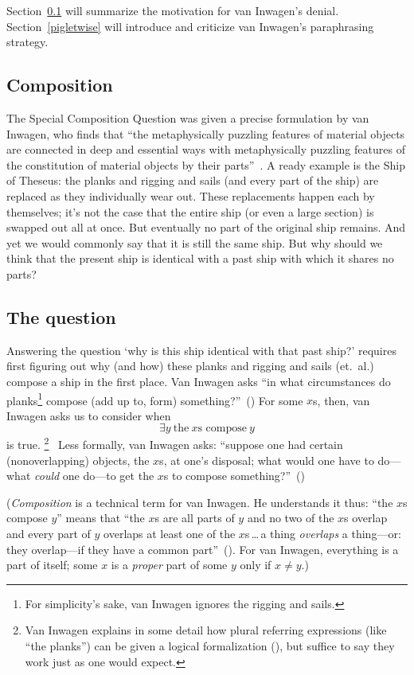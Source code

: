 \documentclass[11pt]{article}
\begin{document}
\begin{spacing}{1.5}
Section~\ref{comp} will summarize the motivation for van Inwagen's denial. Section~\ref{pigletwise} will introduce and criticize van Inwagen's paraphrasing strategy.

\subsection{Composition}
\label{comp}
The Special Composition Question was given a precise formulation by van Inwagen, who finds that ``the metaphysically puzzling features of material objects are connected in deep and essential ways with metaphysically puzzling features of the constitution of material objects by their parts''~\citep[18]{inwagen1995}. A ready example is the Ship of Theseus: the planks and rigging and sails (and every part of the ship) are replaced as they individually wear out. These replacements happen each by themselves; it's not the case that the entire ship (or even a large section) is swapped out all at once. But eventually no part of the original ship remains. And yet we would commonly say that it is still the same ship. But why should we think that the present ship is identical with a past ship with which it shares no parts?

\subsection{The question}
\label{scq}
Answering the question `why is this ship identical with that past ship?' requires first figuring out why (and how) these planks and rigging and sails (et.\ al.) compose a ship in the first place. Van Inwagen asks ``in what circumstances do planks\footnote{For simplicity's sake, van Inwagen ignores the rigging and sails.} compose (add up to, form) something?''~(\citeyear[21]{inwagen1995}) For some $x$s, then, van Inwagen asks us to consider when
\begin{equation}
\exists y\ \text{the}\ x\text{s compose}\ y
\end{equation}
is true.%
\footnote{Van Inwagen explains in some detail how plural referring expressions (like ``the planks'') can be given a logical formalization (\citeyear[23--28]{inwagen1995}), but suffice to say they work just as one would expect.}%
%
\ Less formally, van Inwagen asks: ``suppose one had certain (nonoverlapping) objects, the $x$s, at one's disposal; what would one have to do---what {\em could} one do---to get the $x$s to compose something?''~(\citeyear[31]{inwagen1995})

({\em Composition} is a technical term for van Inwagen. He understands it thus: ``the $x$s compose $y$'' means that ``the $x$s are all parts of $y$ and no two of the $x$s overlap and every part of $y$ overlaps at least one of the $x$s\,\ldots\,a thing {\em overlaps} a thing---or: they overlap---if they have a common part''~(\citeyear[29]{inwagen1995}). For van Inwagen, everything is a part of itself; some $x$ is a {\em proper} part of some $y$ only if $x \neq y$.)


\end{spacing}
\end{document}
